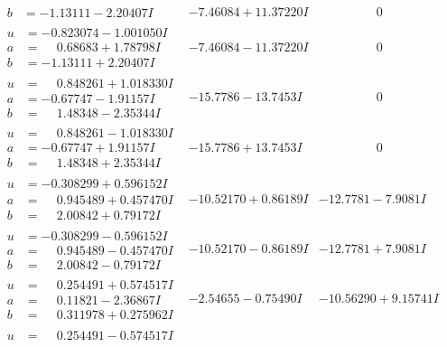 \documentclass[1p]{elsarticle_modified}
\theoremstyle{definition}
\begin{document}
$$\begin{array}{c|c|c}
\begin{aligned}
b &= -1.13111 - 2.20407 I\end{aligned}
 & -7.46084 + 11.37220 I & \phantom{-0.000000 } 0 \\ \hline\begin{aligned}
u &= -0.823074 - 1.001050 I \\
a &= \phantom{-}0.68683 + 1.78798 I \\
b &= -1.13111 + 2.20407 I\end{aligned}
 & -7.46084 - 11.37220 I & \phantom{-0.000000 } 0 \\ \hline\begin{aligned}
u &= \phantom{-}0.848261 + 1.018330 I \\
a &= -0.67747 - 1.91157 I \\
b &= \phantom{-}1.48348 - 2.35344 I\end{aligned}
 & -15.7786 - 13.7453 I & \phantom{-0.000000 } 0 \\ \hline\begin{aligned}
u &= \phantom{-}0.848261 - 1.018330 I \\
a &= -0.67747 + 1.91157 I \\
b &= \phantom{-}1.48348 + 2.35344 I\end{aligned}
 & -15.7786 + 13.7453 I & \phantom{-0.000000 } 0 \\ \hline\begin{aligned}
u &= -0.308299 + 0.596152 I \\
a &= \phantom{-}0.945489 + 0.457470 I \\
b &= \phantom{-}2.00842 + 0.79172 I\end{aligned}
 & -10.52170 + 0.86189 I & -12.7781 - 7.9081 I \\ \hline\begin{aligned}
u &= -0.308299 - 0.596152 I \\
a &= \phantom{-}0.945489 - 0.457470 I \\
b &= \phantom{-}2.00842 - 0.79172 I\end{aligned}
 & -10.52170 - 0.86189 I & -12.7781 + 7.9081 I \\ \hline\begin{aligned}
u &= \phantom{-}0.254491 + 0.574517 I \\
a &= \phantom{-}0.11821 - 2.36867 I \\
b &= \phantom{-}0.311978 + 0.275962 I\end{aligned}
 & -2.54655 - 0.75490 I & -10.56290 + 9.15741 I \\ \hline\begin{aligned}
u &= \phantom{-}0.254491 - 0.574517 I \\

\end{aligned}
\end{array}$$
\end{document}

